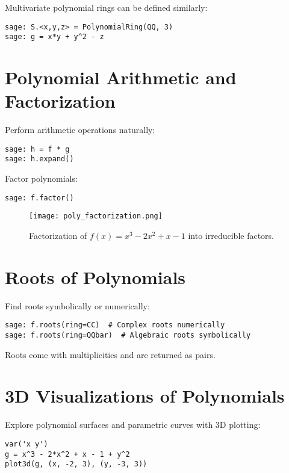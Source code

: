 \documentclass[12pt]{book}
\begin{document}
Multivariate polynomial rings can be defined similarly:

\begin{verbatim}
sage: S.<x,y,z> = PolynomialRing(QQ, 3)
sage: g = x*y + y^2 - z
\end{verbatim}

\section{Polynomial Arithmetic and Factorization}

Perform arithmetic operations naturally:

\begin{verbatim}
sage: h = f * g
sage: h.expand()
\end{verbatim}

Factor polynomials:

\begin{verbatim}
sage: f.factor()
\end{verbatim}

\begin{figure}[H]
  \centering
  \texttt{[image: poly\_factorization.png]}
  \caption{Factorization of \( f(x) = x^3 - 2x^2 + x - 1 \) into irreducible factors.}
  \label{fig:poly_factorization}
\end{figure}

\section{Roots of Polynomials}

Find roots symbolically or numerically:

\begin{verbatim}
sage: f.roots(ring=CC)  # Complex roots numerically
sage: f.roots(ring=QQbar)  # Algebraic roots symbolically
\end{verbatim}

Roots come with multiplicities and are returned as pairs.

\section{3D Visualizations of Polynomials}

Explore polynomial surfaces and parametric curves with 3D plotting:

\begin{verbatim}
var('x y')
g = x^3 - 2*x^2 + x - 1 + y^2
plot3d(g, (x, -2, 3), (y, -3, 3))
\end{verbatim}
\end{document}
